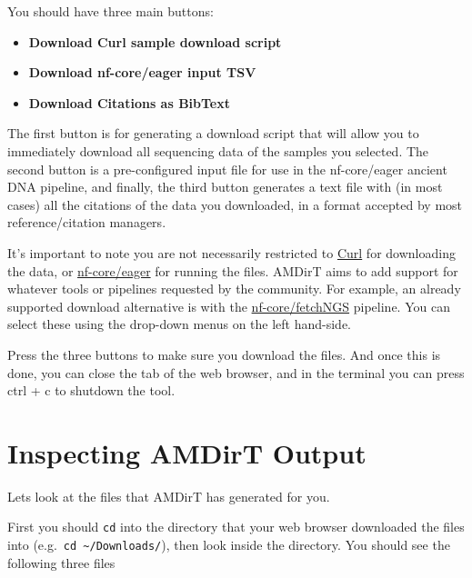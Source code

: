 \documentclass[
  letterpaper,
]{book}
\newenvironment{Shaded}{}{}
\newcommand{\ExtensionTok}[1]{\textcolor[rgb]{0.84,0.23,0.29}{\textbf{#1}}}
\newcommand{\NormalTok}[1]{\textcolor[rgb]{0.14,0.16,0.18}{#1}}
\providecommand{\tightlist}{%
  \setlength{\itemsep}{0pt}\setlength{\parskip}{0pt}}\usepackage{longtable,booktabs,array}
\begin{document}
You should have three main buttons:

\begin{itemize}
\tightlist
\item
  \textbf{Download Curl sample download script}
\item
  \textbf{Download nf-core/eager input TSV}
\item
  \textbf{Download Citations as BibText}
\end{itemize}

The first button is for generating a download script that will allow you
to immediately download all sequencing data of the samples you selected.
The second button is a pre-configured input file for use in the
nf-core/eager ancient DNA pipeline, and finally, the third button
generates a text file with (in most cases) all the citations of the data
you downloaded, in a format accepted by most reference/citation
managers.

It's important to note you are not necessarily restricted to
\href{https://curl.se/}{Curl} for downloading the data, or
\href{https://nf-co.re/eager}{nf-core/eager} for running the files.
AMDirT aims to add support for whatever tools or pipelines requested by
the community. For example, an already supported download alternative is
with the \href{https://nf-co.re/fetchngs}{nf-core/fetchNGS} pipeline.
You can select these using the drop-down menus on the left hand-side.

Press the three buttons to make sure you download the files. And once
this is done, you can close the tab of the web browser, and in the
terminal you can press ctrl + c to shutdown the tool.

\hypertarget{inspecting-amdirt-output}{%
\section{Inspecting AMDirT Output}\label{inspecting-amdirt-output}}

Lets look at the files that AMDirT has generated for you.

First you should \texttt{cd} into the directory that your web browser
downloaded the files into
(e.g.~\texttt{cd\ \textasciitilde{}/Downloads/}), then look inside the
directory. You should see the following three files

\begin{Shaded}
\end{Shaded}
\end{document}
